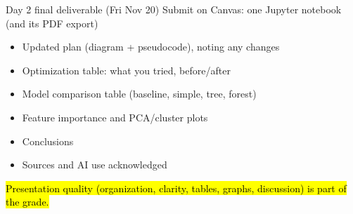 \documentclass[aspectratio=43,11pt]{beamer}
\begin{document}
\begin{frame}{Day 2 final deliverable (Fri Nov 20)}
  Submit on Canvas: one Jupyter notebook (and its PDF export)
  \vspace{0.5em}
  \begin{itemize}
    \item[$\square$] Updated plan (diagram + pseudocode), noting any changes
    \item[$\square$] Optimization table: what you tried, before/after
    \item[$\square$] Model comparison table (baseline, simple, tree, forest)
    \item[$\square$] Feature importance and PCA/cluster plots
    \item[$\square$] Conclusions
    \item[$\square$] Sources and AI use acknowledged
  \end{itemize}
  \vspace{0.8em}
  \hl{Presentation quality (organization, clarity, tables, graphs, discussion)
      is part of the grade.}
\end{frame}
\end{document}
